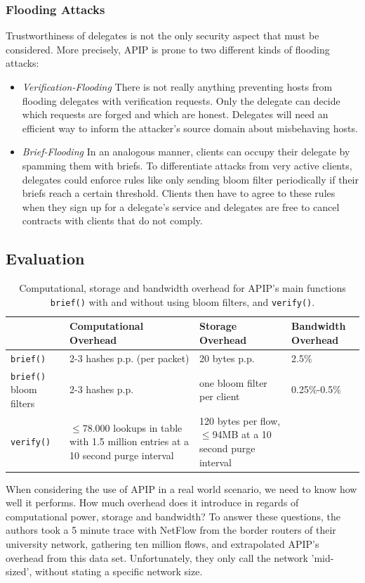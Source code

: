 \documentclass{acm_proc_article-sp}
\begin{document}
\subsubsection{Flooding Attacks}
Trustworthiness of delegates is not the only security aspect that must be considered. More precisely, APIP is prone to two different kinds of flooding attacks:
\begin{itemize}
\item \emph{Verification-Flooding} There is not really anything preventing hosts from flooding delegates with verification requests. Only the delegate can decide which requests are forged and which are honest. Delegates will need an efficient way to inform the attacker's source domain about misbehaving hosts. 
\item \emph{Brief-Flooding} In an analogous manner, clients can occupy their delegate by spamming them with briefs. To differentiate attacks from very active clients, delegates could enforce rules like only sending bloom filter periodically if their briefs reach a certain threshold. Clients then have to agree to these rules when they sign up for a delegate's service and delegates are free to cancel contracts with clients that do not comply.
\end{itemize}

\subsection{Evaluation}
\begin{table}[t]
	\label{tab:evalcomparison}
	\renewcommand{\arraystretch}{1.5}
	\begin{tabularx}{\textwidth}{lXXX}
		\hline 
 		& \textbf{Computational Overhead} & \textbf{Storage Overhead} & \textbf{Bandwidth Overhead} \\ \hline
		\texttt{brief()} & 2-3 hashes p.p. (per packet) & 20 bytes p.p. & 2.5\% \\ 
		\texttt{brief()} bloom filters & 2-3 hashes p.p. & one bloom filter per client & 0.25\%-0.5\% \\ 
		\texttt{verify()} & $\le$78.000 lookups in table with 1.5 million entries at a 10 second purge interval & 120 bytes per flow, $\le$94MB at a 10 second purge interval & \\ 
		\hline
	\end{tabularx}
	\caption{Computational, storage and bandwidth overhead for APIP's main functions \texttt{brief()} with and without using bloom filters, and \texttt{verify()}.}
\end{table}
When considering the use of APIP in a real world scenario, we need to know how well it performs. How much overhead does it introduce in regards of computational power, storage and bandwidth? To answer these questions, the authors took a 5 minute trace with NetFlow from the border routers of their university network, gathering ten million flows, and extrapolated APIP's overhead from this data set. Unfortunately, they only call the network 'mid-sized', without stating a specific network size.
\end{document}
